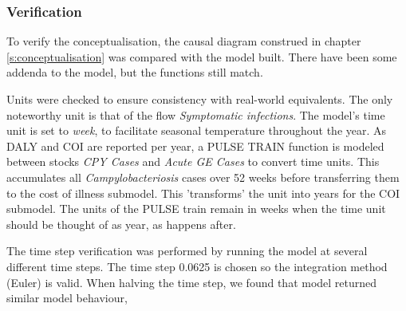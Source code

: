 \subsubsection{Verification}
\label{s:verification}

    
To verify the conceptualisation, the causal diagram construed in chapter \ref{s:conceptualisation} was compared with the model built. There have been some addenda to the model, but the functions still match.  
    
Units were checked to ensure consistency with real-world equivalents. The only noteworthy unit is that of the flow \textit{Symptomatic infections}. The model's time unit is set to \textit{week}, to facilitate seasonal temperature throughout the year. As DALY and COI are reported per year, a PULSE TRAIN function is modeled between stocks \textit{CPY Cases} and \textit{Acute GE Cases} to convert time units. This accumulates all \textit{Campylobacteriosis} cases over 52 weeks before transferring them to the cost of illness submodel. This 'transforms' the unit into years for the COI submodel. The units of the PULSE train remain in weeks when the time unit should be thought of as year, as happens after. 
    
The time step verification was performed by running the model at several different time steps. The time step 0.0625 is chosen so the integration method (Euler) is valid. When halving the time step, we found that model returned similar model behaviour, 


